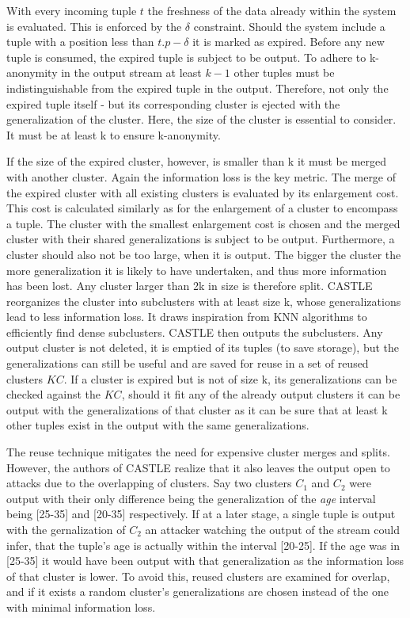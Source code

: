 With every incoming tuple $t$ the freshness of the data already within the system is evaluated. This is enforced by the $\delta$ constraint. Should the system include a tuple with a position less than $t.p - \delta$ it is marked as expired. Before any new tuple is consumed, the expired tuple is subject to be output. To adhere to k-anonymity in the output stream at least $k-1$ other tuples must be indistinguishable from the expired tuple in the output. Therefore, not only the expired tuple itself - but its corresponding cluster is ejected with the generalization of the cluster. Here, the size of the cluster is essential to consider. It must be at least k to ensure k-anonymity. \par 
If the size of the expired cluster, however, is smaller than k it must be merged with another cluster. Again the information loss is the key metric. The merge of the expired cluster with all existing clusters is evaluated by its enlargement cost. This cost is calculated similarly as for the enlargement of a cluster to encompass a tuple. The cluster with the smallest enlargement cost is chosen and the merged cluster with their shared generalizations is subject to be output. Furthermore, a cluster should also not be too large, when it is output. The bigger the cluster the more generalization it is likely to have undertaken, and thus more information has been lost. Any cluster larger than 2k in size is therefore split. CASTLE reorganizes the cluster into subclusters with at least size k, whose generalizations lead to less information loss. It draws inspiration from \ac{KNN} algorithms to efficiently find dense subclusters. CASTLE then outputs the subclusters. Any output cluster is not deleted, it is emptied of its tuples (to save storage), but the generalizations can still be useful and are saved for reuse in a set of reused clusters $KC$. If a cluster is expired but is not of size k, its generalizations can be checked against the $KC$, should it fit any of the already output clusters it can be output with the generalizations of that cluster as it can be sure that at least k other tuples exist in the output with the same generalizations.\par 
The reuse technique mitigates the need for expensive cluster merges and splits. However, the authors of CASTLE realize that it also leaves the output open to attacks due to the overlapping of clusters. Say two clusters $C_1$ and $C_2$ were output with their only difference being the generalization of the \textit{age} interval being [25-35] and [20-35] respectively. If at a later stage, a single tuple is output with the gernalization of $C_2$ an attacker watching the output of the stream could infer, that the tuple's age is actually within the interval [20-25]. If the age was in [25-35] it would have been output with that generalization as the information loss of that cluster is lower. To avoid this, reused clusters are examined for overlap, and if it exists a random cluster's generalizations are chosen instead of the one with minimal information loss. \par 

